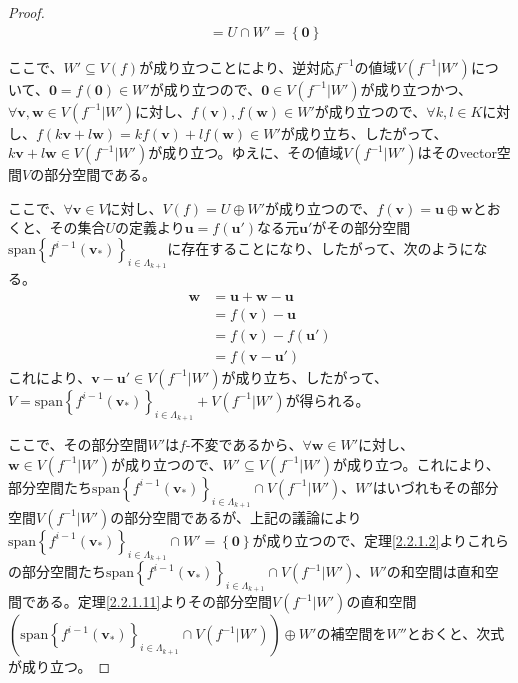 \documentclass[dvipdfmx]{jsarticle}
\begin{document}
\begin{proof}
\begin{align*}
&= U \cap W' = \left\{ \mathbf{0} \right\}
\end{align*}\par
ここで、$W' \subseteq V(f)$が成り立つことにより、逆対応$f^{- 1}$の値域$V\left( f^{- 1}|W' \right)$について、$\mathbf{0} = f\left( \mathbf{0} \right) \in W'$が成り立つので、$\mathbf{0} \in V\left( f^{- 1}|W' \right)$が成り立つかつ、$\forall\mathbf{v},\mathbf{w} \in V\left( f^{- 1}|W' \right)$に対し、$f\left( \mathbf{v} \right),f\left( \mathbf{w} \right) \in W'$が成り立つので、$\forall k,l \in K$に対し、$f\left( k\mathbf{v} + l\mathbf{w} \right) = kf\left( \mathbf{v} \right) + lf\left( \mathbf{w} \right) \in W'$が成り立ち、したがって、$k\mathbf{v} + l\mathbf{w} \in V\left( f^{- 1}|W' \right)$が成り立つ。ゆえに、その値域$V\left( f^{- 1}|W' \right)$はそのvector空間$V$の部分空間である。\par
ここで、$\forall\mathbf{v} \in V$に対し、$V(f) = U \oplus W'$が成り立つので、$f\left( \mathbf{v} \right) = \mathbf{u} \oplus \mathbf{w}$とおくと、その集合$U$の定義より$\mathbf{u} = f\left( \mathbf{u}' \right)$なる元$\mathbf{u}'$がその部分空間${\mathrm{span}}\left\{ f^{i - 1}\left( \mathbf{v}_{*} \right) \right\}_{i \in \varLambda_{k + 1}}$に存在することになり、したがって、次のようになる。
\begin{align*}
\mathbf{w} &= \mathbf{u} + \mathbf{w} - \mathbf{u} \\
&= f\left( \mathbf{v} \right) - \mathbf{u} \\
&= f\left( \mathbf{v} \right) - f\left( \mathbf{u}' \right) \\
&= f\left( \mathbf{v} - \mathbf{u}' \right)
\end{align*}
これにより、$\mathbf{v} - \mathbf{u}' \in V\left( f^{- 1}|W' \right)$が成り立ち、したがって、$V = {\mathrm{span}}\left\{ f^{i - 1}\left( \mathbf{v}_{*} \right) \right\}_{i \in \varLambda_{k + 1}} + V\left( f^{- 1}|W' \right)$が得られる。\par
ここで、その部分空間$W'$は$f$-不変であるから、$\forall\mathbf{w} \in W'$に対し、$\mathbf{w} \in V\left( f^{- 1}|W' \right)$が成り立つので、$W' \subseteq V\left( f^{- 1}|W' \right)$が成り立つ。これにより、部分空間たち${\mathrm{span}}\left\{ f^{i - 1}\left( \mathbf{v}_{*} \right) \right\}_{i \in \varLambda_{k + 1}} \cap V\left( f^{- 1}|W' \right)$、$W'$はいづれもその部分空間$V\left( f^{- 1}|W' \right)$の部分空間であるが、上記の議論により${\mathrm{span}}\left\{ f^{i - 1}\left( \mathbf{v}_{*} \right) \right\}_{i \in \varLambda_{k + 1}} \cap W' = \left\{ \mathbf{0} \right\}$が成り立つので、定理\ref{2.2.1.2}よりこれらの部分空間たち${\mathrm{span}}\left\{ f^{i - 1}\left( \mathbf{v}_{*} \right) \right\}_{i \in \varLambda_{k + 1}} \cap V\left( f^{- 1}|W' \right)$、$W'$の和空間は直和空間である。定理\ref{2.2.1.11}よりその部分空間$V\left( f^{- 1}|W' \right)$の直和空間$\left( {\mathrm{span}}\left\{ f^{i - 1}\left( \mathbf{v}_{*} \right) \right\}_{i \in \varLambda_{k + 1}} \cap V\left( f^{- 1}|W' \right) \right) \oplus W'$の補空間を$W''$とおくと、次式が成り立つ。

\end{proof}
\end{document}
